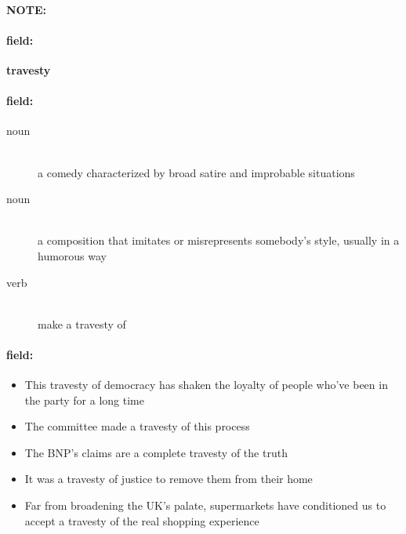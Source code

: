 \documentclass[12pt]{article}
\newenvironment{note}{\paragraph{NOTE:}}{}
\newenvironment{field}{\paragraph{field:}}{}
\begin{document}
\begin{note}
\begin{field}
\textbf{\large travesty}
\end{field}


\begin{field}
\begin{description}
\item[noun] \hfill \\ 
a comedy characterized by broad satire and improbable situations

\item[noun] \hfill \\ 
a composition that imitates or misrepresents somebody's style, usually in a humorous way

\item[verb] \hfill \\ 
make a travesty of

\end{description}
\end{field}

\begin{field}
\begin{itemize}
\item This travesty of democracy has shaken the loyalty of people who've been in the party for a long time
\item The committee made a travesty of this process
\item The BNP's claims are a complete travesty of the truth
\item It was a travesty of justice to remove them from their home
\item Far from broadening the UK's palate, supermarkets have conditioned us to accept a travesty of the real shopping experience
\end{itemize}
\end{field}
\end{note}
\end{document}
